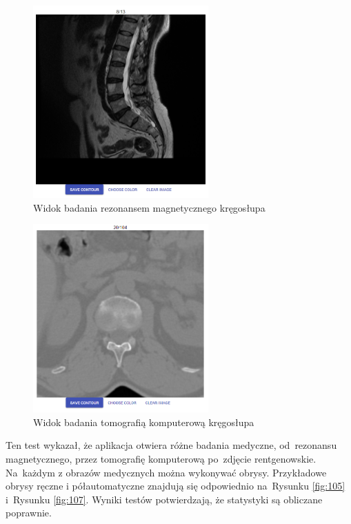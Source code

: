\documentclass[a4paper,11pt,twoside,openright]{report}
\theoremstyle{definition}
\begin{document}
\begin{figure}[p]
	\center
	\includegraphics[width=0.6\textwidth]{114}
	\caption{Widok badania rezonansem magnetycznego kręgosłupa}
    	\label{fig:114}
\end{figure}

\begin{figure}[p]
	\center
	\includegraphics[width=0.6\textwidth]{115}
	\caption{Widok badania tomografią komputerową kręgosłupa}
    	\label{fig:115}
\end{figure}

Ten test wykazał, że aplikacja otwiera różne badania medyczne, od~rezonansu
magnetycznego, przez tomografię komputerową po~zdjęcie rentgenowskie. Na~każdym
z obrazów medycznych można wykonywać obrysy. Przykładowe obrysy ręczne i
półautomatyczne znajdują się odpowiednio na~Rysunku \ref{fig:105} i~Rysunku
\ref{fig:107}. Wyniki testów potwierdzają, że statystyki są obliczane poprawnie.
\end{document}

